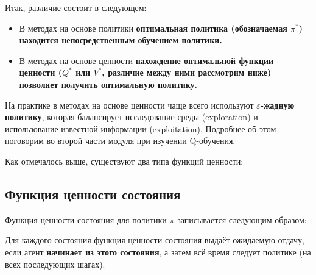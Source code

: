 \documentclass[11pt,a4paper]{article}
\begin{document}
Итак, различие состоит в следующем:

\begin{itemize}
\tightlist
\item
  В методах на основе политики \textbf{оптимальная политика (обозначаемая \(\pi^*\)) находится непосредственным обучением политики.}
\item
  В методах на основе ценности \textbf{нахождение оптимальной функции ценности (\(Q^*\) или \(V^*\), различие между ними рассмотрим ниже) позволяет получить оптимальную политику.}
\end{itemize}


На практике в методах на основе ценности чаще всего используют \textbf{\(\varepsilon\)-жадную политику}, которая балансирует исследование среды (exploration) и использование известной информации (exploitation). Подробнее об этом поговорим во второй части модуля при изучении Q-обучения.

Как отмечалось выше, существуют два типа функций ценности:

\subsection{Функция ценности состояния}\label{the-state-value-function}

Функция ценности состояния для политики \(\pi\) записывается следующим образом:


Для каждого состояния функция ценности состояния выдаёт ожидаемую отдачу, если агент \textbf{начинает из этого состояния}, а затем всё время следует политике (на всех последующих шагах).

\end{document}
